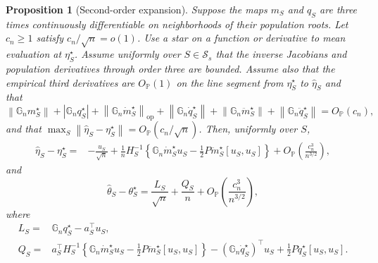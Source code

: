 \documentclass[a4paper,10pt,english]{article}
\newtheorem{proposition}{Proposition}[section]
\newcommand{\Prob}{\mathbb P}
\newcommand{\norm}[1]{\left\lVert #1\right\rVert}
\begin{document}
\begin{proposition}[Second-order expansion]
\label{prop:second-order}
Suppose the maps $m_S$ and $q_S$ are three times continuously
differentiable on neighborhoods of their population roots.  Let $c_n\ge1$
satisfy $c_n/\sqrt n=o(1)$.  Use a star on a function or derivative to
mean evaluation at $\eta_S^\star$.  Assume uniformly over
$S\in\mathcal S_s$ that the inverse Jacobians and population derivatives
through order three are bounded.  Assume also that the empirical third
derivatives are $O_{\Prob}(1)$ on the line segment from $\eta_S^\star$ to
$\hat\eta_S$ and that
\begin{equation}\label{eq:second-order-field-size}
 \norm{\mathbb G_nm_S^\star}
 +|\mathbb G_nq_S^\star|
 +\norm{\mathbb G_n\dot m_S^\star}_{\mathrm{op}}
 +\norm{\mathbb G_n\dot q_S^\star}
 +\norm{\mathbb G_n\ddot m_S^\star}
 +\norm{\mathbb G_n\ddot q_S^\star}
 =O_{\Prob}(c_n),
\end{equation}
and that $\max_S\norm{\hat\eta_S-\eta_S^\star}
=O_{\Prob}(c_n/\sqrt n)$.  Then, uniformly over $S$,
\begin{equation}\label{eq:nuisance-second-order}
\begin{split}
 \hat\eta_S-\eta_S^\star
 ={}&-\frac{u_S}{\sqrt n}
 +\frac1nH_S^{-1}\left\{
       \mathbb G_n\dot m_S^\star u_S
       -\frac12P\ddot m_S^\star[u_S,u_S]
       \right\}
 +O_{\Prob}\left(\frac{c_n^3}{n^{3/2}}\right),
\end{split}
\end{equation}
and
\begin{equation}\label{eq:target-second-order}
 \hat\theta_S-\theta_S^\star
 =\frac{L_S}{\sqrt n}+\frac{Q_S}{n}
 +O_{\Prob}\left(\frac{c_n^3}{n^{3/2}}\right),
\end{equation}
where
\begin{align}
 L_S={}&\mathbb G_nq_S^\star-a_S^\top u_S,
 \label{eq:linear-field}\\
 Q_S={}&a_S^\top H_S^{-1}\left\{
       \mathbb G_n\dot m_S^\star u_S
       -\frac12P\ddot m_S^\star[u_S,u_S]
       \right\}
       -(\mathbb G_n\dot q_S^\star)^\top u_S
       +\frac12P\ddot q_S^\star[u_S,u_S].
 \label{eq:quadratic-field}
\end{align}
\end{proposition}
\end{document}
